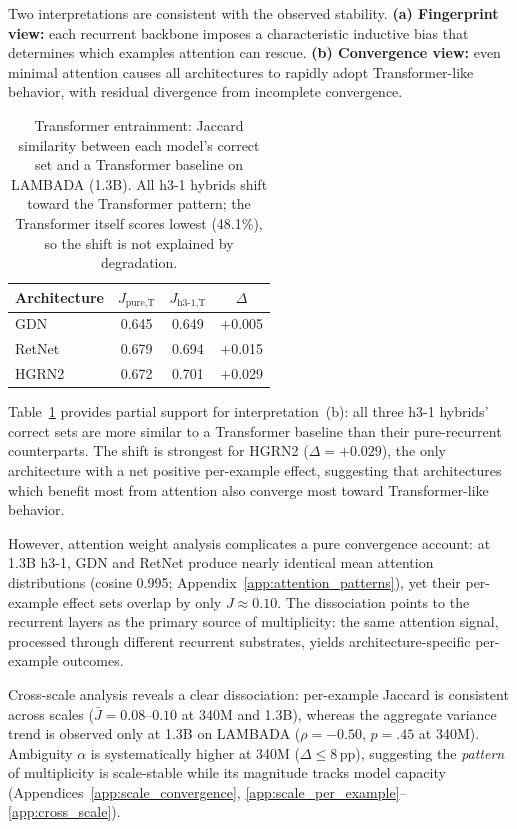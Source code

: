 Two interpretations are consistent with the observed stability. \textbf{(a) Fingerprint view:} each recurrent backbone imposes a characteristic inductive bias that determines which examples attention can rescue. \textbf{(b) Convergence view:} even minimal attention causes all architectures to rapidly adopt Transformer-like behavior, with residual divergence from incomplete convergence.

\begin{table}[t]
\centering
\small
\caption{Transformer entrainment: Jaccard similarity between each model's correct set and a Transformer baseline on LAMBADA (1.3B). All h3-1 hybrids shift toward the Transformer pattern; the Transformer itself scores lowest (48.1\%), so the shift is not explained by degradation.}
\label{tab:entrainment}
\begin{tabular}{@{}lccc@{}}
\toprule
Architecture & $J_{\text{pure,T}}$ & $J_{\text{h3-1,T}}$ & $\Delta$ \\
\midrule
GDN & 0.645 & 0.649 & $+$0.005 \\
RetNet & 0.679 & 0.694 & $+$0.015 \\
HGRN2 & 0.672 & 0.701 & $+$0.029 \\
\bottomrule
\end{tabular}
\end{table}

Table~\ref{tab:entrainment} provides partial support for interpretation~(b): all three h3-1 hybrids' correct sets are more similar to a Transformer baseline than their pure-recurrent counterparts. The shift is strongest for HGRN2 ($\Delta = +0.029$), the only architecture with a net positive per-example effect, suggesting that architectures which benefit most from attention also converge most toward Transformer-like behavior.

However, attention weight analysis complicates a pure convergence account: at 1.3B h3-1, GDN and RetNet produce nearly identical mean attention distributions (cosine 0.995; Appendix~\ref{app:attention_patterns}), yet their per-example effect sets overlap by only $J \approx 0.10$. The dissociation points to the recurrent layers as the primary source of multiplicity: the same attention signal, processed through different recurrent substrates, yields architecture-specific per-example outcomes.

Cross-scale analysis reveals a clear dissociation: per-example Jaccard is consistent across scales ($\bar{J} = 0.08$--$0.10$ at 340M and 1.3B), whereas the aggregate variance trend is observed only at 1.3B on LAMBADA ($\rho = -0.50$, $p = .45$ at 340M). Ambiguity $\alpha$ is systematically higher at 340M ($\Delta \leq 8$\,pp), suggesting the \emph{pattern} of multiplicity is scale-stable while its magnitude tracks model capacity (Appendices~\ref{app:scale_convergence}, \ref{app:scale_per_example}--\ref{app:cross_scale}).
\vspace{-2pt}
